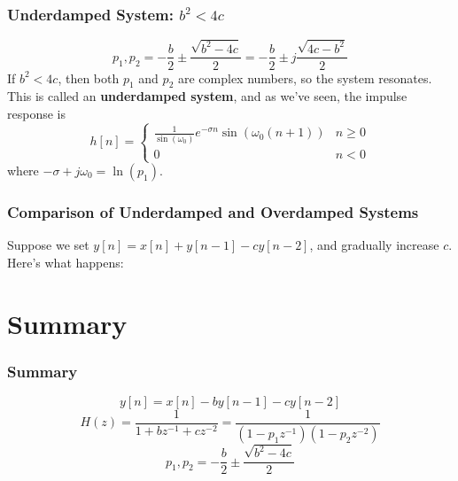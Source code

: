 \documentclass{beamer}
\begin{document}
\begin{frame}
  \frametitle{Underdamped System: $b^2<4c$}
  
  \begin{displaymath}
    p_1,p_2 = -\frac{b}{2}\pm \frac{\sqrt{b^2-4c}}{2}
    = -\frac{b}{2}\pm j\frac{\sqrt{4c-b^2}}{2}
  \end{displaymath}
  If $b^2<4c$, then both $p_1$ and $p_2$ are complex numbers, so the
  system resonates.  This is called an {\bf underdamped system}, and
  as we've seen, the impulse response is
  \begin{displaymath}
    h[n] = \left\{\begin{array}{ll}
    \frac{1}{\sin(\omega_0)}e^{-\sigma n}\sin(\omega_0(n+1)) & n\ge 0\\
    0 & n < 0
    \end{array}\right.
  \end{displaymath}
  where $-\sigma+j\omega_0=\ln(p_1)$.
\end{frame}

\begin{frame}
  \frametitle{Comparison of Underdamped and Overdamped Systems}

  Suppose we set $y[n]=x[n]+y[n-1]-c y[n-2]$, and gradually
  increase $c$.  Here's what happens:
  \begin{center}
  \end{center}
\end{frame}

\section[Summary]{Summary}
\setcounter{subsection}{1}

\begin{frame}
  \frametitle{Summary}

  \begin{displaymath}
    y[n] = x[n] -b y[n-1]-cy[n-2]
  \end{displaymath}
  \begin{displaymath}
    H(z) = \frac{1}{1+bz^{-1}+cz^{-2}} = \frac{1}{(1-p_1z^{-1})(1-p_2z^{-2})}
  \end{displaymath}
  \begin{displaymath}
    p_1,p_2 = -\frac{b}{2} \pm \frac{\sqrt{b^2-4c}}{2}
  \end{displaymath}
\end{frame}
\end{document}
